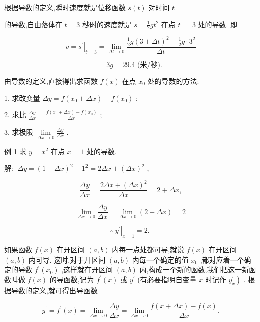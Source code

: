 \documentclass[lang=cn,newtx,10pt,scheme=chinese]{elegantbook}
\begin{document}
根据导数的定义,瞬时速度就是位移函数 \(s\left( t\right)\) 对时间 \(t\)

的导数,自由落体在 \(t = 3\) 秒时的速度就是 \(s = \frac{1}{2}g{t}^{2}\) 在点 \(t =\) 3 处的导数. 即

\[
v = {\left. {s}^{\prime }\right| }_{t = 3} = \mathop{\lim }\limits_{{{\Delta t} \rightarrow 0}}\frac{\frac{1}{2}g{\left( 3 + \Delta t\right) }^{2} - \frac{1}{2}g \cdot {3}^{2}}{\Delta t}
\]

\[
= {3g} = {29.4}\text{ (米/秒). }
\]

由导数的定义,直接得出求函数 \(f\left( x\right)\) 在点 \({x}_{0}\) 处的导数的方法:

1. 求改变量 \({\Delta y} = f\left( {{x}_{0} + {\Delta x}}\right) - f\left( {x}_{0}\right)\) ;

2. 求比 \(\frac{\Delta y}{\Delta x} = \frac{f\left( {{x}_{0} + {\Delta x}}\right) - f\left( {x}_{0}\right) }{\Delta x}\) ;

3. 求极限 \(\mathop{\lim }\limits_{{{\Delta x} \rightarrow 0}}\frac{\Delta y}{\Delta x}\) .

例 1 求 \(y = {x}^{2}\) 在点 \(x = 1\) 处的导数.

解: \(\;{\Delta y} = {\left( 1 + \Delta x\right) }^{2} - {1}^{2} = {2\Delta x} + {\left( \Delta x\right) }^{2}\) ,

\[
\frac{\Delta y}{\Delta x} = \frac{{2\Delta x} + {\left( \Delta x\right) }^{2}}{\Delta x} = 2 + {\Delta x},
\]

\[
\mathop{\lim }\limits_{{{\Delta x} \rightarrow 0}}\frac{\Delta y}{\Delta x} = \mathop{\lim }\limits_{{{\Delta x} \rightarrow 0}}\left( {2 + {\Delta x}}\right) = 2
\]

\[
\therefore {\left. \;{y}^{\prime }\right| }_{x = 1} = 2\text{. }
\]

\begin{definition}[导函数]

如果函数 \(f\left( x\right)\) 在开区间 \(\left( {a,b}\right)\) 内每一点处都可导,就说 \(f\left( x\right)\) 在开区间 \(\left( {a,b}\right)\) 内可导. 这时,对于开区间 \(\left( {a,b}\right)\) 内每一个确定的值 \({x}_{0}\) ,都对应着一个确定的导数 \({f}^{\prime }\left( {x}_{0}\right)\) ,这样就在开区间 \(\left( {a,b}\right)\) 内,构成一个新的函数,我们把这一新函数叫做 \(f\left( x\right)\) 的导函数,记为 \({f}^{\prime }\left( x\right)\) 或 \({y}^{\prime }\) (有必要指明自变量 \(x\) 时记作 \(\left. {y}_{x}^{\prime }\right)\) . 根据导数的定义,就可得出导函数

\[
{y}^{\prime } = {f}^{\prime }\left( x\right) = \mathop{\lim }\limits_{{{\Delta x} \rightarrow 0}}\frac{\Delta y}{\Delta x} = \mathop{\lim }\limits_{{{\Delta x} \rightarrow 0}}\frac{f\left( {x + {\Delta x}}\right) - f\left( x\right) }{\Delta x}. \tag{2}
\]

\end{definition}
\end{document}
